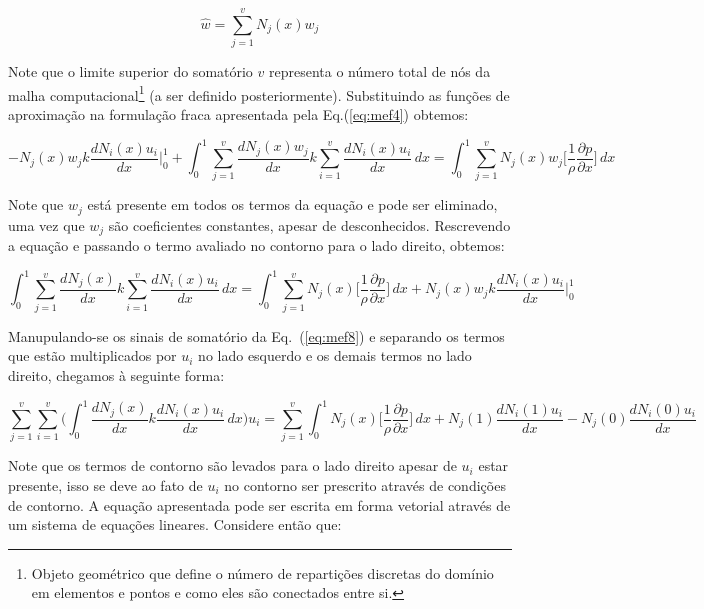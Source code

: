 \begin{equation}
	\hat{w} 
	=
	\sum\limits_{j=1}^v N_j(x) w_j 
	\label{eq:mef6}
\end{equation}

Note que o limite superior do somatório $v$ representa o número total de
nós da malha computacional\footnote{Objeto geométrico que define o
número de repartições discretas do domínio em elementos e pontos e como
eles são conectados entre si.} (a ser definido posteriormente).
Substituindo as funções de aproximação na formulação fraca apresentada
pela Eq.(\ref{eq:mef4}) obtemos:

\begin{equation}
	- N_j(x)w_j k \frac{d N_i(x) u_i}{dx} \bigg|_{0}^{1}
	+
	\int_{0}^{1}  
	\sum\limits_{j=1}^v
	\frac{dN_j(x) w_j}{dx} 
	k
	\sum\limits_{i=1}^v 
	\frac{d N_i(x) u_i}{dx} 
	\, dx
	=
	\int_{0}^{1}  
	\sum\limits_{j=1}^v
	N_j(x) w_j
	\bigg[ \frac{1}{\rho} \frac{\partial p}{\partial x} \bigg]
	\, dx
	\label{eq:mef7}
\end{equation}

Note que $w_j$ está presente em todos os termos da equação e pode ser
eliminado, uma vez que $w_j$ são coeficientes constantes, apesar de
desconhecidos. Rescrevendo a equação e passando o termo avaliado no
contorno para o lado direito, obtemos:

\begin{equation}
	\int_{0}^{1}  
	\sum\limits_{j=1}^v
	\frac{dN_j(x)}{dx} 
	k
	\sum\limits_{i=1}^v 
	\frac{d N_i(x) u_i}{dx} 
	\, dx
	=
	\int_{0}^{1}  
	\sum\limits_{j=1}^v
	N_j(x) 
	\bigg[ \frac{1}{\rho} \frac{\partial p}{\partial x} \bigg]
	\, dx
	+ 
	N_j(x)w_j k \frac{d N_i(x) u_i}{dx} \bigg|_{0}^{1}
	\label{eq:mef8}
\end{equation}

Manupulando-se os sinais de somatório da Eq.~(\ref{eq:mef8}) e separando
os termos que estão multiplicados por $u_i$ no lado esquerdo e os demais
termos no lado direito, chegamos à seguinte forma:

\begin{equation}
	\sum\limits_{j=1}^v
	\sum\limits_{i=1}^v 
	\bigg(
	\int_{0}^{1}  
	\frac{dN_j(x)}{dx} 
	k
	\frac{d N_i(x) u_i}{dx} 
	\, dx
	\bigg)
	u_i
    =
	\sum\limits_{j=1}^v
	\int_{0}^{1}  
	N_j(x) 
	\bigg[ \frac{1}{\rho} \frac{\partial p}{\partial x} \bigg]
	\, dx
	+
	N_j(1) \frac{d N_i(1) u_i}{dx} 
	- 
	N_j(0) \frac{d N_i(0) u_i}{dx}
	\label{eq:mef9}
\end{equation}

Note que os termos de contorno são levados para o lado direito apesar de
$u_i$ estar presente, isso se deve ao fato de $u_i$ no contorno ser
prescrito através de condições de contorno. A equação apresentada pode
ser escrita em forma vetorial através de um sistema de equações
lineares. Considere então que: 

